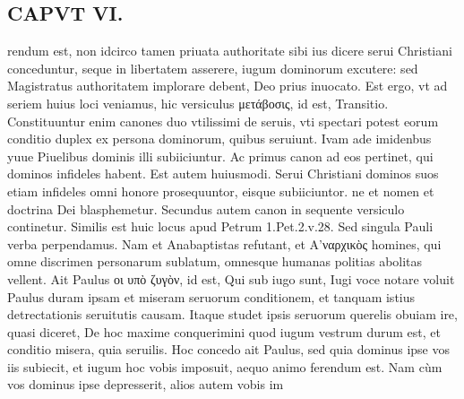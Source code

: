 \documentclass{article}
\begin{document}
\begin{pages}
\section*{CAPVT  VI. }
\marginpar{[ p.41 ]}\pstart rendum est, non idcirco tamen priuata authoritate sibi ius dicere serui Christiani conceduntur, seque in libertatem asserere, iugum dominorum excutere: sed Magistratus authoritatem implorare debent, Deo prius inuocato. Est ergo, vt ad seriem huius loci veniamus, hic versiculus μετάβοσις, id est, Transitio. Constituuntur enim canones duo vtilissimi de seruis, vti spectari potest eorum conditio duplex ex persona dominorum, quibus seruiunt. Ivam ade imidenbus yuue Piuelibus dominis illi subiiciuntur. Ac primus canon ad eos pertinet, qui dominos infideles habent. Est autem huiusmodi.  \pend\pstart Serui Christiani dominos suos etiam infideles omni honore prosequuntor, eisque subiiciuntor. ne et nomen et doctrina Dei blasphemetur. Secundus autem canon in sequente versiculo continetur. Similis est huic locus apud Petrum 1.Pet.2.v.28.  \pend\pstart Sed singula Pauli verba perpendamus. Nam et Anabaptistas refutant, et Α’ναρχικὸς homines, qui omne discrimen personarum sublatum, omnesque humanas politias abolitas vellent.  \pend\pstart Ait Paulus οι υπὸ ζυγὸν, id est, Qui sub iugo sunt, Iugi voce notare voluit Paulus duram ipsam et miseram seruorum conditionem, et tanquam istius detrectationis seruitutis causam. Itaque studet ipsis seruorum querelis obuiam ire, quasi diceret, De hoc maxime conquerimini quod iugum vestrum durum est, et conditio misera, quia seruilis. Hoc concedo ait Paulus, sed quia dominus ipse vos iis subiecit, et iugum hoc vobis imposuit, aequo animo ferendum est. Nam cùm vos dominus ipse depresserit, alios autem vobis im\pend

\end{pages}
\end{document}
